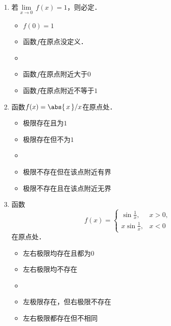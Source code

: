 \begin{enumerate}
\item 若\(\lim\limits_{x\to0} \,f(x) = 1\)，则必定\uline{\makebox[6em]{}}．
  \begin{itemize}
    \renewcommand{\labelitemi}{\faCircleThin}
  \item \(f(0) = 1\)
  \item 函数\(f\)在原点没定义．
    \ifshowsol
    \item[\faCircle]
    \else
    \item
    \fi
    函数\(f\)在原点附近大于\(0\)
  \item 函数\(f\)在原点附近不等于\(1\)
  \end{itemize}

\item 函数\(f(x) = \abs{\,x\,} / x\)在原点处\uline{\makebox[6em]{}}．
  \begin{itemize}
    \renewcommand{\labelitemi}{\faCircleThin}
  \item 极限存在且为\(1\)
  \item 极限存在但不为\(1\)
    \ifshowsol
    \item[\faCircle]
    \else
    \item
    \fi
    极限不存在但在该点附近有界
  \item 极限不存在且在该点附近无界
  \end{itemize}

\item 函数
  \begin{equation*}
    f(x) =
    \begin{cases}
      \sin\frac1x, & x > 0, \\
      x \sin\frac1x, & x < 0
    \end{cases}
  \end{equation*}
  在原点处\uline{\makebox[6em]{}}．
  \begin{itemize}
    \renewcommand{\labelitemi}{\faCircleThin}
  \item 左右极限均存在且都为\(0\)
  \item 左右极限均不存在
    \ifshowsol
    \item[\faCircle]
    \else
    \item
    \fi
    左极限存在，但右极限不存在
  \item 左右极限都存在但不相同
  \end{itemize}


\end{enumerate}
